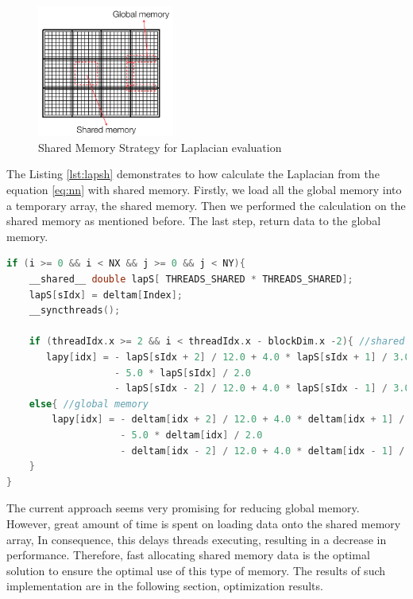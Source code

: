 \begin{figure}[htbp]
	\centering
		\includegraphics[width=0.4\textwidth]{Figures/shared.png}
		\smallskip
	\caption[Shared Memory Strategy]{Shared Memory Strategy for Laplacian evaluation }
	\label{fig:shared}
\end{figure}

The Listing \ref{lst:lapsh} demonstrates to how calculate the Laplacian from the equation \ref{eq:nn} with shared memory. Firstly, we load all the global memory into a temporary array, the shared memory. Then we performed the calculation on the shared memory as mentioned before. The last step, return data to the global memory.

\begin{lstlisting}[language=C++, label={lst:lapsh}, caption={Laplacian evaluating using shared memory with boundaries condition}]
if (i >= 0 && i < NX && j >= 0 && j < NY){
    __shared__ double lapS[ THREADS_SHARED * THREADS_SHARED];
    lapS[sIdx] = deltam[Index];
    __syncthreads();

    if (threadIdx.x >= 2 && i < threadIdx.x - blockDim.x -2){ //shared
       lapy[idx] = - lapS[sIdx + 2] / 12.0 + 4.0 * lapS[sIdx + 1] / 3.0
			  	   - 5.0 * lapS[sIdx] / 2.0
			  	   - lapS[sIdx - 2] / 12.0 + 4.0 * lapS[sIdx - 1] / 3.0;
	else{ //global memory
		lapy[idx] = - deltam[idx + 2] / 12.0 + 4.0 * deltam[idx + 1] / 3.0
			  		- 5.0 * deltam[idx] / 2.0
			  		- deltam[idx - 2] / 12.0 + 4.0 * deltam[idx - 1] / 3.0;
	}
}
\end{lstlisting}

The current approach seems very promising for reducing global memory. However, great amount of time is spent on loading data onto the shared memory array, In consequence, this delays threads executing, resulting in a decrease in performance. Therefore, fast allocating shared memory data is the optimal solution to ensure the optimal use of this type of memory. The results of such implementation are in the following section, optimization results.

